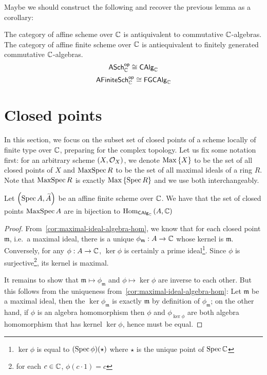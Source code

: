 Maybe we should construct the following and recover the previous lemma as a corollary:
\begin{proposition}
  The category of affine scheme over $\mathbb{C}$ is antiquivalent to commutative $\mathbb{C}$-algebras.
  The category of affine finite scheme over $\mathbb{C}$ is antiequivalent to finitely generated commutative $\mathbb{C}$-algebras.
  \[
    \mathsf{ASch}_{\mathbb{C}}^{\mathsf{op}}\cong \mathsf{CAlg}_{\mathbb{C}}
  \]
  \[
    \mathsf{AFiniteSch}_{\mathbb{C}}^{\mathsf{op}}\cong \mathsf{FGCAlg}_{\mathbb{C}}
  \]
\end{proposition}

\section{Closed points}
In this section, we focus on the subset set of closed points of a scheme locally of finite type over $\mathbb{C}$, preparing for the complex topology. Let us fix some notation first: for an arbitrary scheme $\left(X, \mathcal{O}_{X}\right)$, we denote $\operatorname{Max}\left\{X\right\}$ to be the set of all closed points of $X$ and $\operatorname{MaxSpec} R$ to be the set of all maximal ideals of a ring $R$. Note that $\operatorname{MaxSpec} R$ is exactly $\operatorname{Max}\left\{\operatorname{Spec}{R}\right\}$ and we use both interchangeably.



\begin{proposition}\label{thm:affine-scheme-closed-points-biject-algebra-hom}
  Let $\left(\operatorname*{Spec}{A}, \widetilde{A}\right)$ be an affine finite scheme over $\mathbb{C}$. We have that the set of closed points $\operatorname{MaxSpec} A$ are in bijection to
  $\operatorname{Hom}_{\mathsf{CAlg}_{\mathbb{C}}}\left(A, \mathbb{C}\right)$
\end{proposition}

\begin{proof}
  From~\cref{cor:maximal-ideal-algebra-hom}, we know that for each closed point $\mathfrak m$, i.e.\ a maximal ideal, there is a unique $\phi_{\mathfrak m} : A \to \mathbb{C}$ whose kernel is $\mathfrak m$. Conversely, for any $\phi: A \to \mathbb{C}$, $\ker \phi$ is certainly a prime ideal\footnote{$\ker \phi$ is equal to $(\operatorname{Spec} \phi)(\star)$ where $\star$ is the unique point of $\operatorname{Spec}\mathbb{C}$}. Since $\phi$ is surjective\footnote{for each $c \in \mathbb{C}$, $\phi(c \cdot 1) = c$}, its kernel is maximal.


  It remains to show that $\mathfrak m \mapsto \phi_{\mathfrak{m}}$ and $\phi \mapsto \ker \phi$ are inverse to each other. But this follows from the uniqueness from~\cref{cor:maximal-ideal-algebra-hom}:
  Let $\mathfrak{m}$ be a maximal ideal, then the $\ker \phi_{\mathfrak{m}}$ is exactly $\mathfrak m$ by definition of $\phi_{\mathfrak m}$;
  on the other hand, if $\phi$ is an algebra homomorphism then $\phi$ and $\phi_{\ker \phi}$ are both algebra homomorphism that has kernel $\ker \phi$, hence must be equal.
\end{proof}


